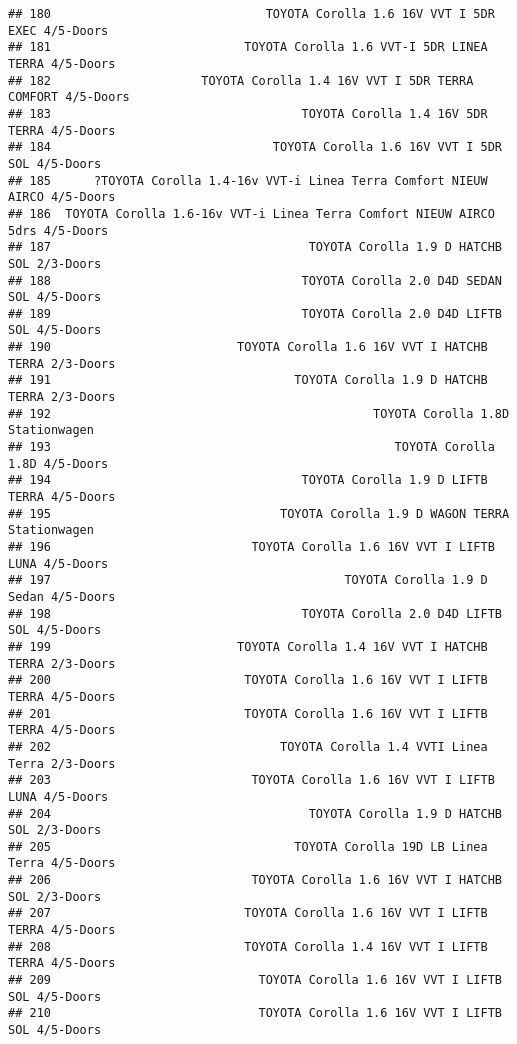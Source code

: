 \documentclass[]{article}
\begin{document}
\begin{verbatim}
## 180                              TOYOTA Corolla 1.6 16V VVT I 5DR EXEC 4/5-Doors
## 181                           TOYOTA Corolla 1.6 VVT-I 5DR LINEA TERRA 4/5-Doors
## 182                     TOYOTA Corolla 1.4 16V VVT I 5DR TERRA COMFORT 4/5-Doors
## 183                                   TOYOTA Corolla 1.4 16V 5DR TERRA 4/5-Doors
## 184                               TOYOTA Corolla 1.6 16V VVT I 5DR SOL 4/5-Doors
## 185      ?TOYOTA Corolla 1.4-16v VVT-i Linea Terra Comfort NIEUW AIRCO 4/5-Doors
## 186  TOYOTA Corolla 1.6-16v VVT-i Linea Terra Comfort NIEUW AIRCO 5drs 4/5-Doors
## 187                                    TOYOTA Corolla 1.9 D HATCHB SOL 2/3-Doors
## 188                                   TOYOTA Corolla 2.0 D4D SEDAN SOL 4/5-Doors
## 189                                   TOYOTA Corolla 2.0 D4D LIFTB SOL 4/5-Doors
## 190                          TOYOTA Corolla 1.6 16V VVT I HATCHB TERRA 2/3-Doors
## 191                                  TOYOTA Corolla 1.9 D HATCHB TERRA 2/3-Doors
## 192                                             TOYOTA Corolla 1.8D Stationwagen
## 193                                                TOYOTA Corolla 1.8D 4/5-Doors
## 194                                   TOYOTA Corolla 1.9 D LIFTB TERRA 4/5-Doors
## 195                                TOYOTA Corolla 1.9 D WAGON TERRA Stationwagen
## 196                            TOYOTA Corolla 1.6 16V VVT I LIFTB LUNA 4/5-Doors
## 197                                         TOYOTA Corolla 1.9 D Sedan 4/5-Doors
## 198                                   TOYOTA Corolla 2.0 D4D LIFTB SOL 4/5-Doors
## 199                          TOYOTA Corolla 1.4 16V VVT I HATCHB TERRA 2/3-Doors
## 200                           TOYOTA Corolla 1.6 16V VVT I LIFTB TERRA 4/5-Doors
## 201                           TOYOTA Corolla 1.6 16V VVT I LIFTB TERRA 4/5-Doors
## 202                                TOYOTA Corolla 1.4 VVTI Linea Terra 2/3-Doors
## 203                            TOYOTA Corolla 1.6 16V VVT I LIFTB LUNA 4/5-Doors
## 204                                    TOYOTA Corolla 1.9 D HATCHB SOL 2/3-Doors
## 205                                  TOYOTA Corolla 19D LB Linea Terra 4/5-Doors
## 206                            TOYOTA Corolla 1.6 16V VVT I HATCHB SOL 2/3-Doors
## 207                           TOYOTA Corolla 1.6 16V VVT I LIFTB TERRA 4/5-Doors
## 208                           TOYOTA Corolla 1.4 16V VVT I LIFTB TERRA 4/5-Doors
## 209                             TOYOTA Corolla 1.6 16V VVT I LIFTB SOL 4/5-Doors
## 210                             TOYOTA Corolla 1.6 16V VVT I LIFTB SOL 4/5-Doors

\end{verbatim}
\end{document}
